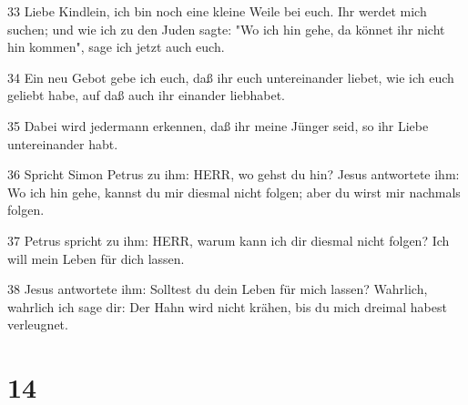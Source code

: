 \par 33 Liebe Kindlein, ich bin noch eine kleine Weile bei euch. Ihr werdet mich suchen; und wie ich zu den Juden sagte: "Wo ich hin gehe, da könnet ihr nicht hin kommen", sage ich jetzt auch euch.
\par 34 Ein neu Gebot gebe ich euch, daß ihr euch untereinander liebet, wie ich euch geliebt habe, auf daß auch ihr einander liebhabet.
\par 35 Dabei wird jedermann erkennen, daß ihr meine Jünger seid, so ihr Liebe untereinander habt.
\par 36 Spricht Simon Petrus zu ihm: HERR, wo gehst du hin? Jesus antwortete ihm: Wo ich hin gehe, kannst du mir diesmal nicht folgen; aber du wirst mir nachmals folgen.
\par 37 Petrus spricht zu ihm: HERR, warum kann ich dir diesmal nicht folgen? Ich will mein Leben für dich lassen.
\par 38 Jesus antwortete ihm: Solltest du dein Leben für mich lassen? Wahrlich, wahrlich ich sage dir: Der Hahn wird nicht krähen, bis du mich dreimal habest verleugnet.

\chapter{14}

